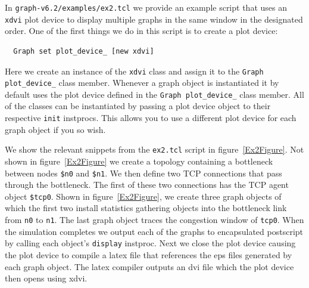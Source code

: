 \documentclass[11pt]{article}
\begin{document}
In \verb|graph-v6.2/examples/ex2.tcl| we provide an example script
that uses an \verb|xdvi| plot device to display multiple graphs in the
same window in the designated order.  One of the first things we do
in this script is to create a plot device:

\begin{verbatim}
  Graph set plot_device_ [new xdvi]
\end{verbatim}

Here we create an instance of the \verb|xdvi| class and assign it to
the \verb|Graph plot_device_| class member.  Whenever a graph object is
instantiated it by default uses the plot device defined in the 
\verb|Graph plot_device_| class member.  All of the classes can be 
instantiated by passing a plot device object to their respective
\verb|init| instprocs.  This allows you to use a different plot
device for each graph object if you so wish.

We show the relevant snippets from the \verb|ex2.tcl| script in
figure~\ref{Ex2Figure}.  Not shown in figure~\ref{Ex2Figure} we
create a topology containing a bottleneck between nodes \verb|$n0| and
\verb|$n1|.  We then define two TCP connections that pass through the
bottleneck.  The first of these two connections has the TCP agent object
\verb|$tcp0|.  Shown in figure~\ref{Ex2Figure}, we create three graph
objects of which the first two install statistics gathering objects
into the bottleneck link from \verb|n0| to \verb|n1|.  The last graph
object traces the congestion window of \verb|tcp0|.  When the
simulation completes we output each of the graphs to encapsulated
postscript by calling each object's \verb|display| instproc.  Next
we close the plot device causing the plot device to compile a latex
file that references the eps files generated by each graph object.  The
latex compiler outputs an dvi file which the plot device then opens
using xdvi.
\end{document}
